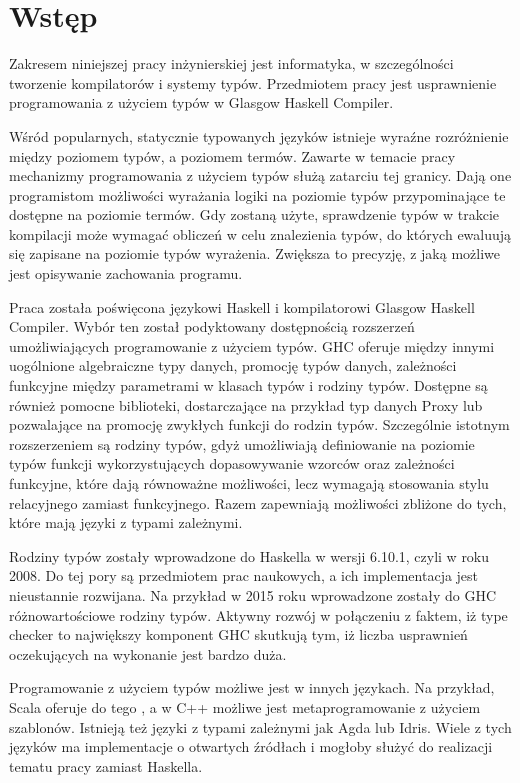 \chapter{Wstęp}\label{chap:wstep}

Zakresem niniejszej pracy inżynierskiej jest informatyka, w szczególności tworzenie kompilatorów i systemy typów. Przedmiotem pracy jest usprawnienie programowania z użyciem typów w Glasgow Haskell Compiler.

Wśród popularnych, statycznie typowanych języków istnieje wyraźne rozróżnienie między poziomem typów, a poziomem termów. Zawarte w temacie pracy mechanizmy programowania z użyciem typów służą zatarciu tej granicy. Dają one programistom możliwości wyrażania logiki na poziomie typów przypominające te dostępne na poziomie termów. Gdy zostaną użyte, sprawdzenie typów w trakcie kompilacji może wymagać obliczeń w celu znalezienia typów, do których ewaluują się zapisane na poziomie typów wyrażenia. Zwiększa to precyzję, z jaką możliwe jest opisywanie zachowania programu.

Praca została poświęcona językowi Haskell i kompilatorowi Glasgow Haskell Compiler. Wybór ten został podyktowany dostępnością rozszerzeń umożliwiających programowanie z użyciem typów. GHC oferuje między innymi uogólnione algebraiczne typy danych, promocję typów danych, zależności funkcyjne między parametrami w klasach typów i rodziny typów. Dostępne są również pomocne biblioteki, dostarczające na przykład typ danych Proxy lub pozwalające na promocję zwykłych funkcji do rodzin typów. Szczególnie istotnym rozszerzeniem są rodziny typów, gdyż umożliwiają definiowanie na poziomie typów funkcji wykorzystujących dopasowywanie wzorców oraz zależności funkcyjne, które dają równoważne możliwości, lecz wymagają stosowania stylu relacyjnego zamiast funkcyjnego. Razem zapewniają możliwości zbliżone do tych, które mają języki z typami zależnymi.

Rodziny typów zostały wprowadzone do Haskella w wersji 6.10.1, czyli w roku 2008. Do tej pory są przedmiotem prac naukowych, a ich implementacja jest nieustannie rozwijana. Na przykład w 2015 roku wprowadzone zostały do GHC różnowartościowe rodziny typów. Aktywny rozwój w połączeniu z faktem, iż type checker to największy komponent GHC\cite{AOSA} skutkują tym, iż liczba usprawnień oczekujących na wykonanie jest bardzo duża.

Programowanie z użyciem typów możliwe jest w innych językach. Na przykład, Scala oferuje do tego , a w C++ możliwe jest metaprogramowanie z użyciem szablonów. Istnieją też języki z typami zależnymi jak Agda lub Idris. Wiele z tych języków ma implementacje o otwartych źródłach i mogłoby służyć do realizacji tematu pracy zamiast Haskella.

